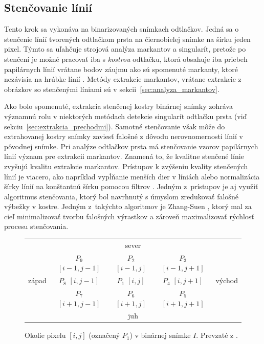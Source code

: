   \subsection{Stenčovanie línií} \label{sec:stencovanie}
  Tento krok sa vykonáva na binarizovaných snímkach odtlačkov. Jedná sa o stenčenie línií tvorených odtlačkom prsta na čiernobielej snímke na šírku
  jeden pixel. Týmto sa uľahčuje strojová analýza markantov a singularít, pretože po stenčení je možné pracovať iba s \emph{kostrou} odtlačku,
  ktorá obsahuje iba priebeh papilárnych línií vrátane bodov záujmu ako sú spomenuté markanty, ktoré nezávisia na hrúbke línií \cite{Handbook}.
  Metódy extrakcie markantov, vrátane extrakcie z obrázkov so stenčenými líniami sú v sekcii~{\ref{sec:analyza_markantov}}.
  
  Ako bolo spomenuté, extrakcia stenčenej kostry binárnej snímky zohráva významnú rolu v niektorých metódach detekcie singularít odtlačku prsta
  (viď sekciu~{\ref{sec:extrakcia_prechodmi}}).
  Samotné stenčovanie však môže do extrahovanej kostry snímky zaviesť falošné  z dôvodu nerovnomernosti línií v pôvodnej snímke.
  Pri analýze odtlačkov prsta má stenčovanie vzorov papilárnych línií význam pre extrakcii markantov. Znamená to, že kvalitne stenčené línie zvyšujú kvalitu
  extrakcie markantov. Prístupov k zvýšeniu kvality stenčených línií je viacero, ako napríklad vypĺňanie menších dier v líniách alebo normalizácia šírky
  línií na konštantnú šírku pomocou filtrov \cite{Handbook}. Jedným z~prístupov je aj využiť algoritmus stenčovania, ktorý bol navrhnutý s úmyslom zredukovať
  falošné výbežky v kostre. Jedným z~takýchto algoritmov je Zhang-Suen \cite{ZhangSuen_thinning}, ktorý mal za cieľ minimalizovať tvorbu falošných výrastkov
  a zároveň maximalizovať rýchlosť procesu stenčovania.
  
  \begin{figure}[h]
    \centering
      \begin{tabular}{ l | c | c | c | l }
        \multicolumn{5}{c}{sever} \\
        \cline{2-4}
        & \makecell{$P_9$ \\ $[i-1,j-1]$} & \makecell{$P_2$ \\ $[i-1,j]$} & \makecell{$P_3$ \\ $[i-1,j+1]$} \\ \cline{2-4}
        západ & \makecell{$P_8$ \\ $[i,j-1]$} & \makecell{$P_1$ \\ $[i,j]$} & \makecell{$P_4$ \\ $[i,j+1]$} & východ \\ \cline{2-4}
        & \makecell{$P_7$ \\ $[i+1,j-1]$} & \makecell{$P_6$ \\ $[i+1,j]$} & \makecell{$P_5$ \\ $[i+1,j+1]$} \\
        \cline{2-4}
        \multicolumn{5}{c}{juh}
      \end{tabular}
    \caption{Okolie pixelu $[i,j]$ (označený $P_1$) v binárnej snímke $I$. Prevzaté z \cite{ZhangSuen_thinning}.}
    \label{obr:okolie_ZhangSuen}
  \end{figure}


